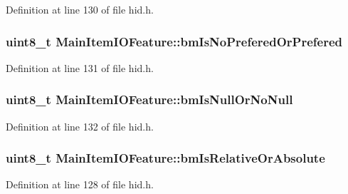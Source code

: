 \-Definition at line 130 of file hid.\-h.

\hypertarget{struct_main_item_i_o_feature_afd8eca62fe742513103795799d960d01}{
\subsubsection[{bm\-Is\-No\-Prefered\-Or\-Prefered}]{\setlength{\rightskip}{0pt plus 5cm}uint8\-\_\-t {\bf \-Main\-Item\-I\-O\-Feature\-::bm\-Is\-No\-Prefered\-Or\-Prefered}}}\label{struct_main_item_i_o_feature_afd8eca62fe742513103795799d960d01}


\-Definition at line 131 of file hid.\-h.

\hypertarget{struct_main_item_i_o_feature_a9673a5c3415a2f43b488aa32181b1f4c}{
\subsubsection[{bm\-Is\-Null\-Or\-No\-Null}]{\setlength{\rightskip}{0pt plus 5cm}uint8\-\_\-t {\bf \-Main\-Item\-I\-O\-Feature\-::bm\-Is\-Null\-Or\-No\-Null}}}\label{struct_main_item_i_o_feature_a9673a5c3415a2f43b488aa32181b1f4c}


\-Definition at line 132 of file hid.\-h.

\hypertarget{struct_main_item_i_o_feature_aeb93d03989043229774d2a6832e48628}{
\subsubsection[{bm\-Is\-Relative\-Or\-Absolute}]{\setlength{\rightskip}{0pt plus 5cm}uint8\-\_\-t {\bf \-Main\-Item\-I\-O\-Feature\-::bm\-Is\-Relative\-Or\-Absolute}}}\label{struct_main_item_i_o_feature_aeb93d03989043229774d2a6832e48628}


\-Definition at line 128 of file hid.\-h.

